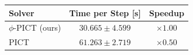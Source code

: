 \begin{tabular}{lcc}
\toprule
Solver & Time per Step [s] & Speedup \\
\midrule
$\phi$-PICT (ours) & $30.665 \pm 4.599$ & $\times1.00$ \\
PICT & $61.263 \pm 2.719$ & $\times0.50$ \\
\bottomrule
\end{tabular}

